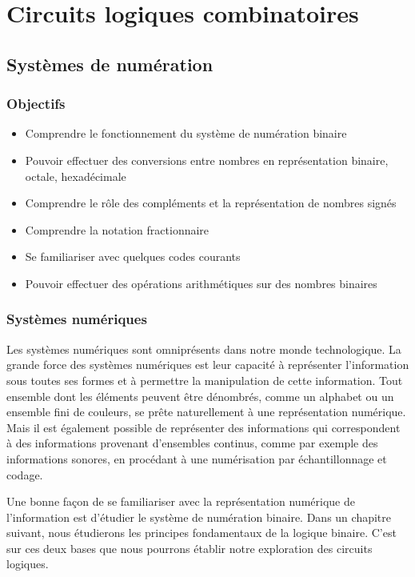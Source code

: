 \documentclass[letter, oneside]{book}
\begin{document}
\setcounter{tocdepth}{3}
\tableofcontents
\listoffigures
\listoftables
\listoflistings

\part{Circuits logiques combinatoires}
\label{sec:org40eb22c}
\chapter{Systèmes de numération}
\label{sec:org768190c}


\section{Objectifs}
\label{sec:orgc0793ab}

\begin{itemize}
\item Comprendre le fonctionnement du système de numération binaire
\item Pouvoir effectuer des conversions entre nombres en représentation
binaire, octale, hexadécimale
\item Comprendre le rôle des compléments et la représentation de nombres signés
\item Comprendre la notation fractionnaire
\item Se familiariser avec quelques codes courants
\item Pouvoir effectuer des opérations arithmétiques sur des nombres binaires
\end{itemize}

\section{Systèmes numériques}
\label{sec:orga64c89d}

Les systèmes numériques sont omniprésents dans notre monde
technologique. La grande force des systèmes numériques est leur
capacité à représenter l'information sous toutes ses formes et à
permettre la manipulation de cette information. Tout ensemble dont les
éléments peuvent être dénombrés, comme un alphabet ou un ensemble fini
de couleurs, se prête naturellement à une représentation
numérique. Mais il est également possible de représenter des
informations qui correspondent à des informations provenant
d'ensembles continus, comme par exemple des informations sonores, en
procédant à une numérisation par échantillonnage et codage. 

Une bonne façon de se familiariser avec la représentation numérique de
l'information est d'étudier le système de numération binaire. Dans un
chapitre suivant, nous étudierons les principes fondamentaux de la
logique binaire. C'est sur ces deux bases que nous pourrons établir
notre exploration des circuits logiques.
\end{document}
